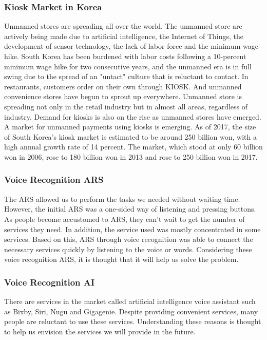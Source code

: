 \documentclass[conference,compsoc]{IEEEtran}
\begin{document}
\subsubsection{Kiosk Market in Korea}
Unmanned stores are spreading all over the world. The unmanned store are actively being made due to artificial intelligence, the Internet of Things, the development of sensor technology, the lack of labor force and the minimum wage hike. South Korea has been burdened with labor costs following a 10-percent minimum wage hike for two consecutive years, and the unmanned era is in full swing due to the spread of an "untact" culture that is reluctant to contact. In restaurants, customers order on their own through KIOSK. And unmanned convenience stores have begun to sprout up everywhere. Unmanned store is spreading not only in the retail industry but in almost all areas, regardless of industry. Demand for kiosks is also on the rise as unmanned stores have emerged. A market for unmanned payments using kiosks is emerging. As of 2017, the size of South Korea's kiosk market is estimated to be around 250 billion won, with a high annual growth rate of 14 percent. The market, which stood at only 60 billion won in 2006, rose to 180 billion won in 2013 and rose to 250 billion won in 2017.

\subsubsection{Voice Recognition ARS}
The ARS allowed us to perform the tasks we needed without waiting time. However, the initial ARS was a one-sided way of listening and pressing buttons. As people become accustomed to ARS, they can't wait to get the number of services they need. In addition, the service used was mostly concentrated in some services. Based on this, ARS through voice recognition was able to connect the necessary services quickly by listening to the voice or words. Considering these voice recognition ARS, it is thought that it will help us solve the problem.

\subsubsection{Voice Recognition AI}
There are services in the market called artificial intelligence voice assistant such as Bixby, Siri, Nugu and Gigagenie. Despite providing convenient services, many people are reluctant to use these services. Understanding these reasons is thought to help us envision the services we will provide in the future.
\end{document}
